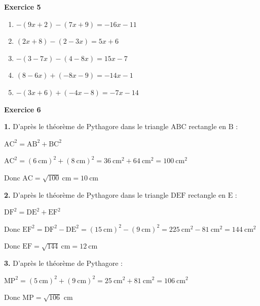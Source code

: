 \documentclass[12pt,a4paper,french]{article}
\begin{document}
\noindent\textbf{Exercice 5}\par
\smallskip
\begin{enumerate}
\item $-(9x + 2)-(7x + 9) = -16x - 11$
\item $(2x + 8)-(2 - 3x) = 5x + 6$
\item $-(3 - 7x)-(4 - 8x) = 15x - 7$
\item $(8 - 6x)+(-8x - 9) = -14x - 1$
\item $-(3x + 6)+(-4x - 8) = -7x - 14$
\end{enumerate}
\medskip

\noindent\textbf{Exercice 6}\par
\smallskip
\textbf{1.} D'après le théorème de Pythagore dans le triangle \ensuremath{\mathrm{A}}\ensuremath{\mathrm{B}}\ensuremath{\mathrm{C}} rectangle en \ensuremath{\mathrm{B}} :

$\ensuremath{\mathrm{A}}\ensuremath{\mathrm{C}}^2 = \ensuremath{\mathrm{A}}\ensuremath{\mathrm{B}}^2 + \ensuremath{\mathrm{B}}\ensuremath{\mathrm{C}}^2$

$\ensuremath{\mathrm{A}}\ensuremath{\mathrm{C}}^2 = (6~\text{cm})^2 + (8~\text{cm})^2 = 36~\text{cm}^2 + 64~\text{cm}^2 = 100~\text{cm}^2$

Donc $\ensuremath{\mathrm{A}}\ensuremath{\mathrm{C}} = \sqrt{100}~\text{cm} = 10~\text{cm}$

\medskip
\textbf{2.} D'après le théorème de Pythagore dans le triangle \ensuremath{\mathrm{D}}\ensuremath{\mathrm{E}}\ensuremath{\mathrm{F}} rectangle en \ensuremath{\mathrm{E}} :

$\ensuremath{\mathrm{D}}\ensuremath{\mathrm{F}}^2 = \ensuremath{\mathrm{D}}\ensuremath{\mathrm{E}}^2 + \ensuremath{\mathrm{E}}\ensuremath{\mathrm{F}}^2$

Donc $\ensuremath{\mathrm{E}}\ensuremath{\mathrm{F}}^2 = \ensuremath{\mathrm{D}}\ensuremath{\mathrm{F}}^2 - \ensuremath{\mathrm{D}}\ensuremath{\mathrm{E}}^2 = (15~\text{cm})^2 - (9~\text{cm})^2 = 225~\text{cm}^2 - 81~\text{cm}^2 = 144~\text{cm}^2$

Donc $\ensuremath{\mathrm{E}}\ensuremath{\mathrm{F}} = \sqrt{144}~\text{cm} = 12~\text{cm}$

\medskip
\textbf{3.} D'après le théorème de Pythagore :

$\ensuremath{\mathrm{M}}\ensuremath{\mathrm{P}}^2 = (5~\text{cm})^2 + (9~\text{cm})^2 = 25~\text{cm}^2 + 81~\text{cm}^2 = 106~\text{cm}^2$

Donc $\ensuremath{\mathrm{M}}\ensuremath{\mathrm{P}} = \sqrt{106}$ cm
\end{document}
